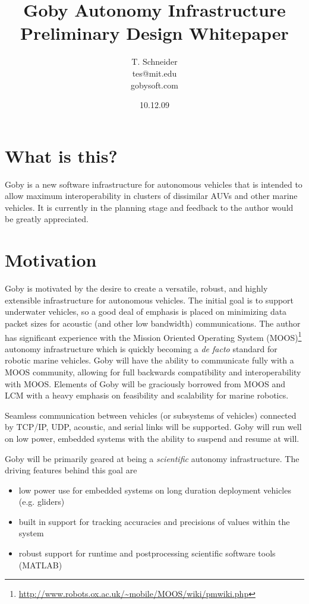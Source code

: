 \documentclass[10pt,letterpaper]{article}
\author{T. Schneider \\ tes@mit.edu \\ gobysoft.com}
\title{Goby Autonomy Infrastructure Preliminary Design Whitepaper}
\date{10.12.09}
\begin{document}
\maketitle 


\section{What is this?}
Goby is a new software infrastructure for autonomous vehicles that is intended to allow maximum interoperability in clusters of dissimilar AUVs and other marine vehicles. It is currently in the planning stage and feedback to the author would be greatly appreciated.

\section{Motivation}

Goby is motivated by the desire to create a versatile, robust, and highly extensible infrastructure for autonomous vehicles. The initial goal is to support underwater vehicles, so a good deal of emphasis is placed on minimizing data packet sizes for acoustic (and other low bandwidth) communications. The author has significant experience with the Mission Oriented Operating System (MOOS)\footnote{\url{http://www.robots.ox.ac.uk/~mobile/MOOS/wiki/pmwiki.php}} autonomy infrastructure which is quickly becoming a \textit{de facto} standard for robotic marine vehicles. Goby will have the ability to communicate fully with a MOOS community, allowing for full backwards compatibility and interoperability with MOOS.
Elements of Goby will be graciously borrowed from MOOS and LCM with a heavy emphasis on feasibility and scalability for marine robotics.

Seamless communication between vehicles (or subsystems of vehicles) connected by TCP/IP, UDP, acoustic, and serial links will be supported. Goby will run well on low power, embedded systems with the ability to suspend and resume at will.

Goby will be primarily geared at being a \textit{scientific} autonomy infrastructure. The driving features behind this goal are

\begin{itemize}
\item low power use for embedded systems on long duration deployment vehicles (e.g. gliders)
\item built in support for tracking accuracies and precisions of values within the system
\item robust support for runtime and postprocessing scientific software tools (MATLAB)
\end{itemize}
\end{document}
